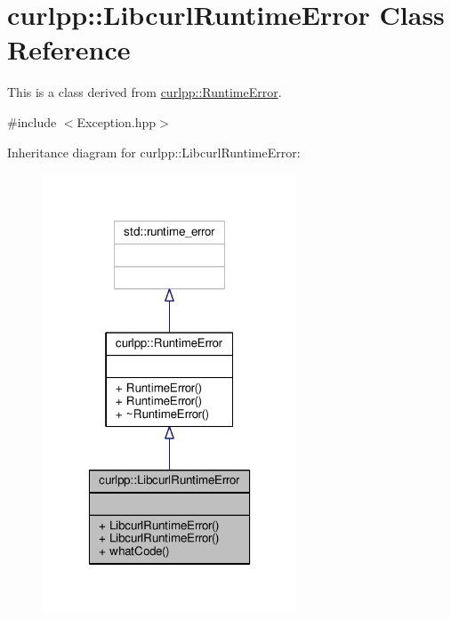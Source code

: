 \hypertarget{classcurlpp_1_1LibcurlRuntimeError}{\section{curlpp\-:\-:Libcurl\-Runtime\-Error Class Reference}
\label{classcurlpp_1_1LibcurlRuntimeError}
}


This is a class derived from \hyperlink{classcurlpp_1_1RuntimeError}{curlpp\-::\-Runtime\-Error}.  




{\ttfamily \#include $<$Exception.\-hpp$>$}



Inheritance diagram for curlpp\-:\-:Libcurl\-Runtime\-Error\-:
\nopagebreak
\begin{figure}[H]
\begin{center}
\leavevmode
\includegraphics[width=214pt]{classcurlpp_1_1LibcurlRuntimeError__inherit__graph}
\end{center}
\end{figure}


